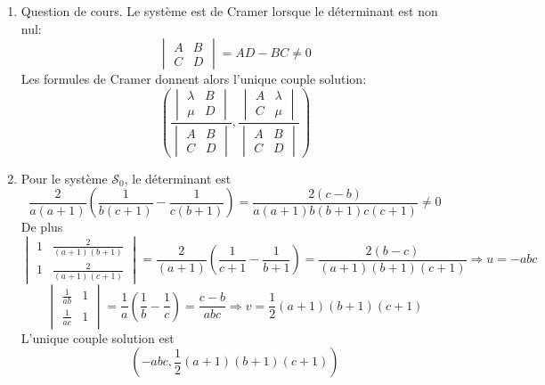 \begin{enumerate}
  \item Question de cours.
Le système est de Cramer lorsque le déterminant est  non nul:
\begin{displaymath}
  \begin{vmatrix}
A & B \\ C & D    
  \end{vmatrix}
=AD - BC \neq 0
\end{displaymath}
Les formules de Cramer donnent alors l'unique couple solution:
\begin{displaymath}
  (\frac{  \begin{vmatrix}
\lambda & B \\ \mu & D    
  \end{vmatrix}
}{  \begin{vmatrix}
A & B \\ C & D    
  \end{vmatrix}
},
\frac{  \begin{vmatrix}
A & \lambda \\ C & \mu    
  \end{vmatrix}
}{  \begin{vmatrix}
A & B \\ C & D    
  \end{vmatrix}
}
)
\end{displaymath}

  \item Pour le système $\mathcal{S}_0$, le déterminant est
\begin{displaymath}
  \frac{2}{a(a+1)}\left( \frac{1}{b(c+1)} - \frac{1}{c(b+1)}\right)
  = \frac{2(c-b)}{a(a+1)b(b+1)c(c+1)} \neq 0
\end{displaymath}
De plus
\begin{displaymath}
\renewcommand{\arraystretch}{1.8}
\begin{vmatrix}
1 & \frac{2}{(a+1)(b+1)} \\ 1& \frac{2}{(a+1)(c+1)}    
\end{vmatrix}
= \frac{2}{(a+1)}\left( \frac{1}{c+1}-\frac{1}{b+1}\right)
= \frac{2(b-c)}{(a+1)(b+1)(c+1)}
\Rightarrow
u = -abc
\end{displaymath}
\begin{displaymath}
\renewcommand{\arraystretch}{1.8}
\begin{vmatrix}
 \frac{1}{ab} & 1\\ \frac{1}{ac} & 1    
\end{vmatrix}
= \frac{1}{a}\left( \frac{1}{b}-\frac{1}{c}\right)
= \frac{c-b}{abc}
\Rightarrow
v = \frac{1}{2}(a+1)(b+1)(c+1)
\end{displaymath}
L'unique couple solution est
\begin{displaymath}
  (-abc, \frac{1}{2}(a+1)(b+1)(c+1))
\end{displaymath}


\end{enumerate}
